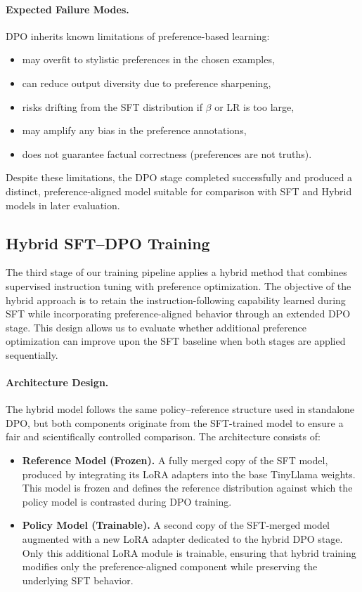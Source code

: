 \documentclass[11pt,a4paper]{article}
\begin{document}
\paragraph{Expected Failure Modes.}
DPO inherits known limitations of preference-based learning:
\begin{itemize}
    \item may overfit to stylistic preferences in the chosen examples,
    \item can reduce output diversity due to preference sharpening,
    \item risks drifting from the SFT distribution if $\beta$ or LR is too large,
    \item may amplify any bias in the preference annotations,
    \item does not guarantee factual correctness (preferences are not truths).
\end{itemize}

Despite these limitations, the DPO stage completed successfully and produced a distinct, preference-aligned model suitable for comparison with SFT and Hybrid models in later evaluation.

\subsection{Hybrid SFT--DPO Training}

The third stage of our training pipeline applies a hybrid method that combines supervised instruction tuning with preference optimization. The objective of the hybrid approach is to retain the instruction-following capability learned during SFT while incorporating preference-aligned behavior through an extended DPO stage. This design allows us to evaluate whether additional preference optimization can improve upon the SFT baseline when both stages are applied sequentially.

\paragraph{Architecture Design.} 
The hybrid model follows the same policy--reference structure used in standalone DPO, but both components originate from the SFT-trained model to ensure a fair and scientifically controlled comparison. The architecture consists of:

\begin{itemize}
    \item \textbf{Reference Model (Frozen).} A fully merged copy of the SFT model, produced by integrating its LoRA adapters into the base TinyLlama weights. This model is frozen and defines the reference distribution against which the policy model is contrasted during DPO training.
    \item \textbf{Policy Model (Trainable).} A second copy of the SFT-merged model augmented with a new LoRA adapter dedicated to the hybrid DPO stage. Only this additional LoRA module is trainable, ensuring that hybrid training modifies only the preference-aligned component while preserving the underlying SFT behavior.
\end{itemize}
\end{document}
